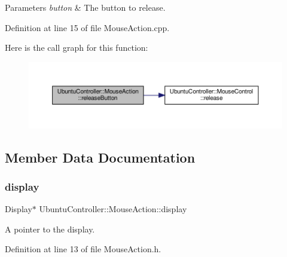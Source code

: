 \begin{DoxyParams}{Parameters}
{\em button} & The button to release. \\
\hline
\end{DoxyParams}


Definition at line 15 of file Mouse\+Action.\+cpp.

Here is the call graph for this function\+:
\nopagebreak
\begin{figure}[H]
\begin{center}
\leavevmode
\includegraphics[width=350pt]{class_ubuntu_controller_1_1_mouse_action_ab1ac193e88baf8614c55ca2fa7a3b430_cgraph}
\end{center}
\end{figure}


\subsection{Member Data Documentation}
\mbox{\label{class_ubuntu_controller_1_1_mouse_action_abda7df4e11759c46bd0c419575353e8a}} 
\subsubsection{\texorpdfstring{display}{display}}
{\footnotesize\ttfamily Display$\ast$ Ubuntu\+Controller\+::\+Mouse\+Action\+::display\hspace{0.3cm}{\ttfamily [private]}}



A pointer to the display. 



Definition at line 13 of file Mouse\+Action.\+h.

\mbox{\label{class_ubuntu_controller_1_1_mouse_action_aac4074eeeab2989da4a645ed9c118c22}} 
